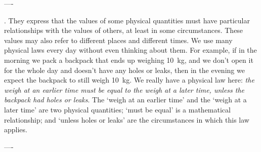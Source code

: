 

----


. They express that the values of some physical quantities must have particular relationships with the values of others, at least in some circumstances. These values may also refer to different places and different times. We use many physical laws every day without even thinking about them. For example, if in the morning we pack a backpack that ends up weighing \qty{10}{kg}, and we don't open it for the whole day and doesn't have any holes or leaks, then in the evening we expect the backpack to still weigh \qty{10}{kg}. We really have a physical law here: \emph{the weigh at an earlier time must be equal to the weigh at a later time, unless the backpack had holes or leaks}. The \enquote*{weigh at an earlier time} and the \enquote*{weigh at a later time} are two physical quantities; \enquote*{must be equal} is a mathematical relationship; and \enquote*{unless holes or leaks} are the circumstances in which this law applies.

----

